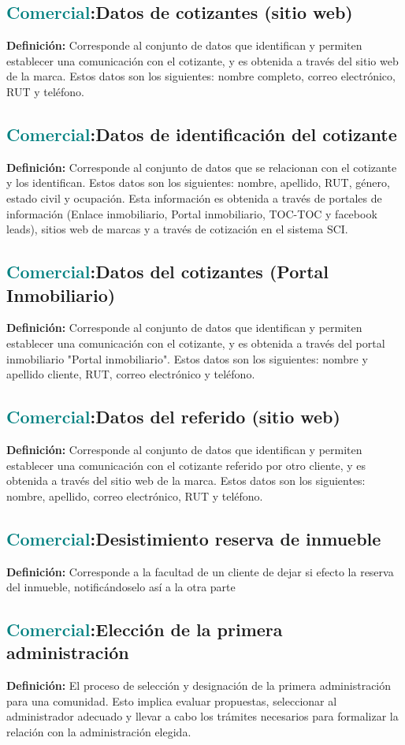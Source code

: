 \documentclass[12pt]{article}
\begin{document}
\subsection{\textcolor{teal}{Comercial}:{Datos de cotizantes (sitio web)}}
\textbf{Definición:} Corresponde al conjunto de datos que identifican y permiten establecer una comunicación con el cotizante, y es obtenida a través del sitio web de la marca. Estos datos son los siguientes: nombre completo, correo electrónico, RUT y teléfono.
\subsection{\textcolor{teal}{Comercial}:{Datos de identificación del cotizante}}
\textbf{Definición:} Corresponde al conjunto de datos que se relacionan con el cotizante y los identifican. Estos datos son los siguientes: nombre, apellido, RUT, género, estado civil y ocupación. Esta información es obtenida a través de portales de información (Enlace inmobiliario, Portal inmobiliario, TOC-TOC y facebook leads), sitios web de marcas y a través de cotización en el sistema SCI.
\subsection{\textcolor{teal}{Comercial}:{Datos del cotizantes (Portal Inmobiliario)}}
\textbf{Definición:} Corresponde al conjunto de datos que identifican y permiten establecer una comunicación con el cotizante, y es obtenida a través del portal inmobiliario "Portal inmobiliario". Estos datos son los siguientes: nombre y apellido cliente, RUT, correo electrónico y teléfono.
\subsection{\textcolor{teal}{Comercial}:{Datos del referido (sitio web)}}
\textbf{Definición:} Corresponde al conjunto de datos que identifican y permiten establecer una comunicación con el cotizante referido por otro cliente, y es obtenida a través del sitio web de la marca. Estos datos son los siguientes: nombre, apellido, correo electrónico, RUT y teléfono.
\subsection{\textcolor{teal}{Comercial}:{Desistimiento reserva de inmueble}}
\textbf{Definición:} Corresponde a la facultad de un cliente de dejar si efecto la reserva del inmueble, notificándoselo así a la otra parte
\subsection{\textcolor{teal}{Comercial}:{Elección de la primera administración}}
\textbf{Definición:} El proceso de selección y designación de la primera administración para una comunidad. Esto implica evaluar propuestas, seleccionar al administrador adecuado y llevar a cabo los trámites necesarios para formalizar la relación con la administración elegida.
\end{document}
